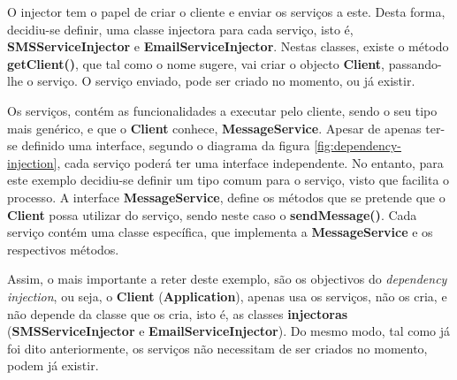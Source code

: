O injector tem o papel de criar o cliente e enviar os serviços a este. Desta forma, decidiu-se definir, uma classe injectora para cada serviço, isto é, \textbf{SMSServiceInjector} e \textbf{EmailServiceInjector}. Nestas classes, existe o método \textbf{getClient()}, que tal como o nome sugere, vai criar o objecto \textbf{Client}, passando-lhe o serviço. O serviço enviado, pode ser criado no momento, ou já existir.

Os serviços, contém as funcionalidades a executar pelo cliente, sendo o seu tipo mais genérico, e que o \textbf{Client} conhece, \textbf{MessageService}. Apesar de apenas ter-se definido uma interface, segundo o diagrama da figura \ref{fig:dependency-injection}, cada serviço poderá ter uma interface independente. No entanto, para este exemplo decidiu-se definir um tipo comum para o serviço, visto que facilita o processo. A interface \textbf{MessageService}, define os métodos que se pretende que o \textbf{Client} possa utilizar do serviço, sendo neste caso o \textbf{sendMessage()}.
Cada serviço contém uma classe específica, que implementa a \textbf{MessageService} e os respectivos métodos.

Assim, o mais importante a reter deste exemplo, são os objectivos do \textit{dependency injection}, ou seja, o \textbf{Client} (\textbf{Application}), apenas usa os serviços, não os cria, e não depende da classe que os cria, isto é, as classes \textbf{injectoras} (\textbf{SMSServiceInjector} e \textbf{EmailServiceInjector}). Do mesmo modo, tal como já foi dito anteriormente, os serviços não necessitam de ser criados no momento, podem já existir. 

